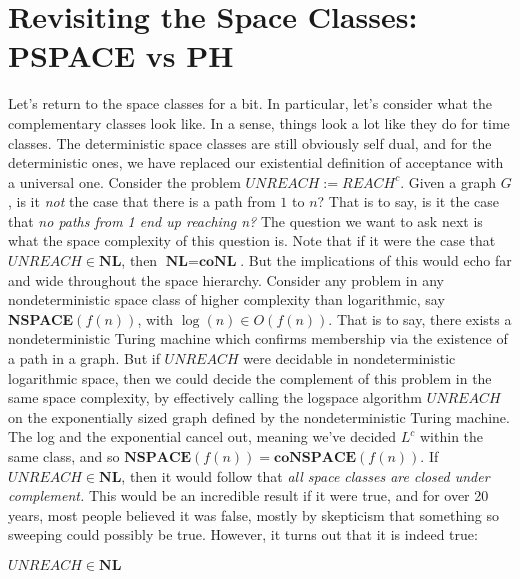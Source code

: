 \section{Revisiting the Space Classes: PSPACE vs PH}
\par Let's return to the space classes for a bit. In particular, let's consider what the complementary classes look like. In a sense, things look a lot like they do for time classes. The deterministic space classes are still obviously self dual, and for the deterministic ones, we have replaced our existential definition of acceptance with a universal one. Consider the problem $UNREACH := REACH^c$. Given a graph $G$, is it \textit{not} the case that there is a path from $1$ to $n$? That is to say, is it the case that \textit{no paths from 1 end up reaching n?} The question we want to ask next is what the space complexity of this question is. Note that if it were the case that $UNREACH \in \textbf{NL}$, then $\textbf{NL} = \textbf{coNL}$. But the implications of this would echo far and wide throughout the space hierarchy. Consider any problem in any nondeterministic space class of higher complexity than logarithmic, say \textbf{NSPACE$(f(n))$}, with $\log(n) \in O(f(n))$. That is to say, there exists a nondeterministic Turing machine which confirms membership via the existence of a path in a graph. But if $UNREACH$ were decidable in nondeterministic logarithmic space, then we could decide the complement of this problem in the same space complexity, by effectively calling the logspace algorithm $UNREACH$ on the exponentially sized graph defined by the nondeterministic Turing machine. The log and the exponential cancel out, meaning we've decided $L^c$ within the same class, and so $\textbf{NSPACE$(f(n))$} = \textbf{coNSPACE$(f(n))$}$. If $UNREACH \in \textbf{NL}$, then it would follow that \textit{all space classes are closed under complement.} This would be an incredible result if it were true, and for over 20 years, most people believed it was false, mostly by skepticism that something so sweeping could possibly be true. However, it turns out that it is indeed true:
\begin{theorem}
    $UNREACH \in \textbf{NL}$
\end{theorem}
